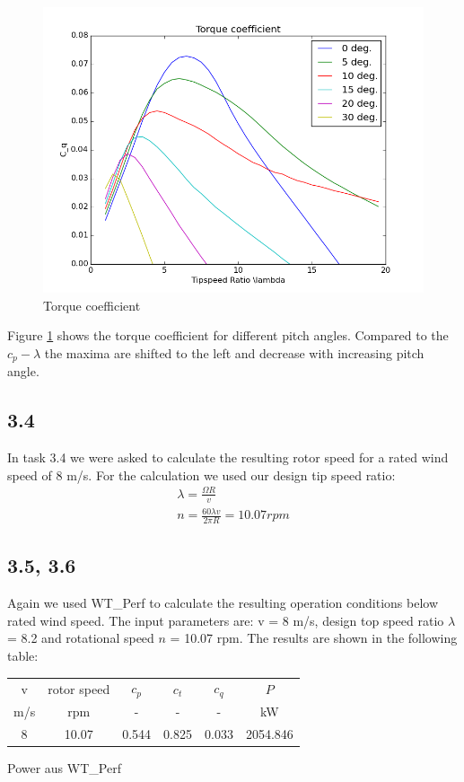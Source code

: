 \documentclass[10pt]{article}
\begin{document}
\begin{figure}[H]
\centering
\includegraphics[width=1\linewidth]{../CIP_3/WT_Perf/Output/torque.png}
\caption{Torque coefficient}
\label{fig:torque-coeff}
\end{figure} 
Figure \ref{fig:torque-coeff} shows the torque coefficient for different pitch angles. Compared to the $c_p-\lambda$ the maxima are shifted to the left and decrease with increasing pitch angle.  
\subsection{3.4}
In task 3.4 we were asked to calculate the resulting rotor speed for a rated wind speed of 8 m/s. For the calculation we used our design tip speed ratio:
\begin{align}
\lambda = \frac{\Omega R}{v}\\
n = \frac{60 \lambda v}{2 \pi R} = 10.07 rpm
\end{align}
\subsection{3.5, 3.6}
Again we used WT\_Perf to calculate the resulting operation conditions below rated wind speed. The input parameters are: v = 8 m/s, design top speed ratio $\lambda$ = 8.2 and rotational speed $n$ = 10.07 rpm. The results are shown in the following table:\\

\begin{tabular}{|c |c| c| c| c| c|}
\hline
v & rotor speed & $c_p$ & $c_t$ & $c_q$ & $P$\\
m/s &rpm & - &- &-& kW\\
\hline
8 &10.07&0.544&0.825&0.033& 2054.846\\
\hline
\end{tabular}
Power aus WT\_Perf
\end{document}
